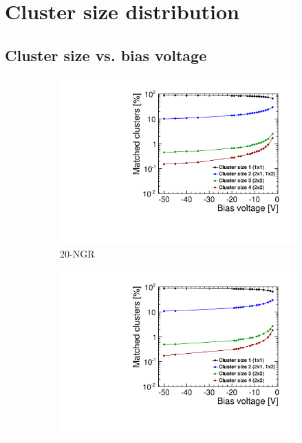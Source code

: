 \newpage
\section{Cluster size distribution}
\subsection{Cluster size vs. bias voltage}
\begin{figure}[htbp] \centering
  \begin{subfigure}[b]{0.33\textwidth}
    \includegraphics[width=\textwidth]{./figures/TestBeam/cluSize_biasScan_W0019_G07.pdf}
    \caption{20-NGR}
  \end{subfigure} \hfill
  \begin{subfigure}[b]{0.33\textwidth}
    \includegraphics[width=\textwidth]{./figures/TestBeam/cluSize_biasScan_W0019_F07.pdf}

\end{subfigure}
\end{figure}
